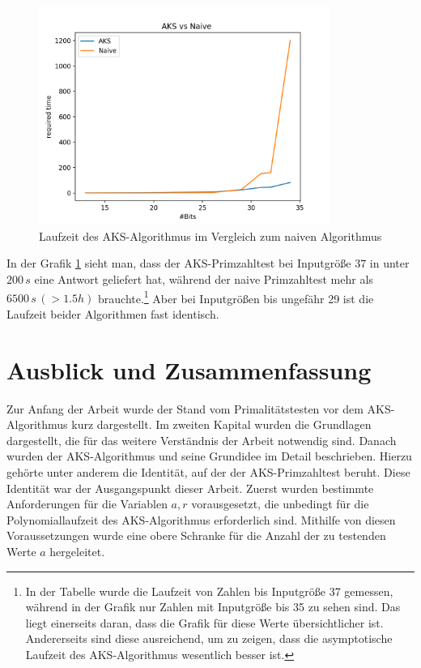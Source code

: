 \documentclass[12pt,oneside]{article}
\theoremstyle{remark}
\theoremstyle{definition}
\begin{document}
\begin{figure}[h]
\includegraphics[width=9.5cm]{plots/aksVsNaive.png}
\centering
\caption{Laufzeit des AKS-Algorithmus im Vergleich zum naiven Algorithmus}
\label{plot_aks_naive}
\end{figure}

In der Grafik \ref{plot_aks_naive} sieht man, dass der AKS-Primzahltest bei Inputgröße $37$ in unter $200 \, s$ eine Antwort geliefert hat, während der naive Primzahltest mehr als $6500 \, s \, (> 1.5 h)$ brauchte.\footnote{In der Tabelle wurde die Laufzeit von Zahlen bis Inputgröße 37 gemessen, während in der Grafik nur Zahlen mit Inputgröße bis 35 zu sehen sind. Das liegt  einerseits daran, dass die Grafik für diese Werte übersichtlicher ist. Andererseits sind diese ausreichend, um zu zeigen, dass die asymptotische Laufzeit des AKS-Algorithmus wesentlich besser ist.} Aber bei Inputgrößen bis ungefähr 29 ist die Laufzeit beider Algorithmen fast identisch. 

\newpage


\section{Ausblick und Zusammenfassung}
Zur Anfang der Arbeit wurde der Stand vom Primalitätstesten vor dem AKS-Algorithmus kurz dargestellt. Im zweiten Kapital wurden die Grundlagen dargestellt, die für das weitere Verständnis der Arbeit notwendig sind. Danach wurden der AKS-Algorithmus und seine Grundidee im Detail beschrieben. Hierzu gehörte unter anderem die Identität, auf der der AKS-Primzahltest beruht. Diese Identität war der Ausgangspunkt dieser Arbeit. Zuerst wurden bestimmte Anforderungen für die Variablen $a,r$ vorausgesetzt, die unbedingt für die Polynomiallaufzeit des AKS-Algorithmus erforderlich sind. Mithilfe von diesen Voraussetzungen wurde eine obere Schranke für die Anzahl der zu testenden Werte $a$ hergeleitet.
\end{document}
